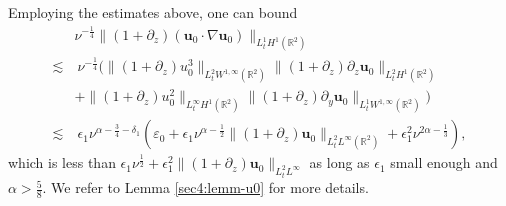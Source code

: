 \documentclass[11pt,reqno]{article}
\numberwithin{equation}{section}
\newcommand\R{{\mathbb R}}
\newcommand\uu{\bm{u}}
\let\pa=\partial
\let\al=\alpha
\let\var=\varepsilon
\let\f=\frac
\let\ep=\epsilon
\begin{document}
Employing the estimates above, one can bound 
\begin{align*}
    & \nu^{-\f14}\|(1+\pa_z)(\uu_0\cdot\nabla\uu_0)\|_{L^1_tH^{1}(\R^2)}
    \nonumber
    \\
    \lesssim 
    &~
    \nu^{-\f14}\big(\|(1+\pa_z)u^3_0\|_{L^2_tW^{1,\infty}(\R^2)}
    \|(1+\pa_z)\pa_z \uu_0\|_{L^2_tH^{1}(\R^2)}
    \nonumber
    \\
     & +\|(1+\pa_z)u^2_0\|_{L^\infty_tH^{1}(\R^2)}
    \|(1+\pa_z)\pa_y \uu_0\|_{L^1_tW^{1,\infty}(\R^2)}\big)
    \nonumber
    \\
    \lesssim
    &~\ep_1\nu^{\al-\f34-\delta_1} (\var_0+\ep_1\nu^{\al-\f12}\|(1+\pa_z)\uu_0\|_{L^2_tL^\infty(\R^2)}+\ep_1^2\nu^{2\al-\f13}),
\end{align*}
which is less than $\ep_1\nu^{\f12}+\ep_1^2 \|(1+\pa_z)\uu_0\|_{L^2_tL^\infty}$ as long as $\ep_1$ small enough and $\alpha> \f58.$ We refer to Lemma \ref{sec4:lemm-u0} for more details. 







\bigskip
\end{document}
